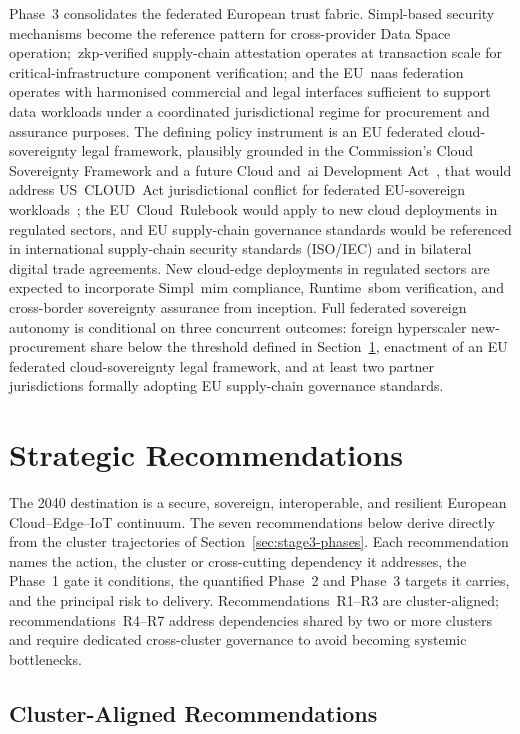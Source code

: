 \documentclass{ieeeaccess}
\begin{document}
Phase~3 consolidates the federated European trust fabric. Simpl-based security mechanisms become the reference pattern for cross-provider Data Space operation;~\gls{zkp}-verified supply-chain attestation operates at transaction scale for critical-infrastructure component verification; and the EU~\gls{naas} federation operates with harmonised commercial and legal interfaces sufficient to support data workloads under a coordinated jurisdictional regime for procurement and assurance purposes. The defining policy instrument is an EU federated cloud-sovereignty legal framework, plausibly grounded in the Commission's Cloud Sovereignty Framework and a future Cloud and~\gls{ai} Development Act~\cite{ec2025cloudsov}, that would address US~CLOUD~Act jurisdictional conflict for federated EU-sovereign workloads~\cite{microsoftsenat2025}; the EU~Cloud~Rulebook would apply to new cloud deployments in regulated sectors, and EU supply-chain governance standards would be referenced in international supply-chain security standards (ISO/IEC) and in bilateral digital trade agreements. New cloud-edge deployments in regulated sectors are expected to incorporate Simpl~\gls{mim} compliance, Runtime~\acrshort{sbom} verification, and cross-border sovereignty assurance from inception. Full federated sovereign autonomy is conditional on three concurrent outcomes: foreign hyperscaler new-procurement share below the threshold defined in Section~\ref{sec:recs}, enactment of an EU federated cloud-sovereignty legal framework, and at least two partner jurisdictions formally adopting EU supply-chain governance standards.


\section{Strategic Recommendations}
\label{sec:recs}

The 2040 destination is a secure, sovereign, interoperable, and resilient European Cloud--Edge--IoT continuum. The seven recommendations below derive directly from the cluster trajectories of Section~\ref{sec:stage3-phases}. Each recommendation names the action, the cluster or cross-cutting dependency it addresses, the Phase~1 gate it conditions, the quantified Phase~2 and Phase~3 targets it carries, and the principal risk to delivery. Recommendations~R1--R3 are cluster-aligned; recommendations~R4--R7 address dependencies shared by two or more clusters and require dedicated cross-cluster governance to avoid becoming systemic bottlenecks.

\subsection{Cluster-Aligned Recommendations}
\label{sec:recs-cluster}
\end{document}
